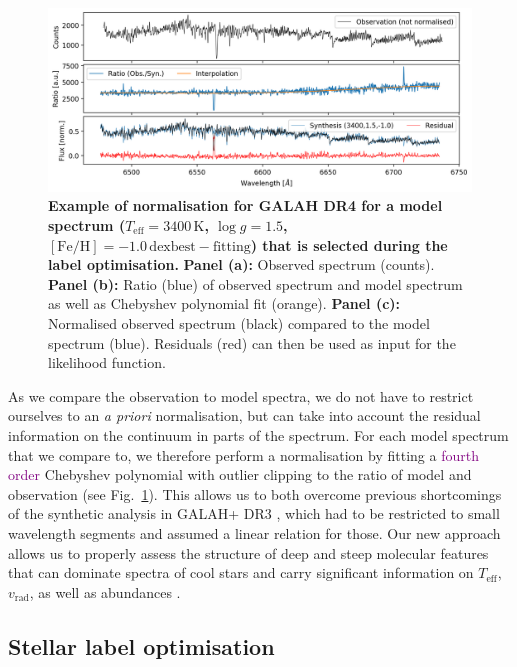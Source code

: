 \documentclass[
  journal=pasa,
  manuscript=research-paper, %
  year=2024,
  volume=37
]{cup-journal}
\newcommand{\adjusted}[1]{{\textcolor{purple}{#1}}}
\newcommand{\Teff}{$T_\mathrm{eff}$\xspace}
\newcommand{\vrad}{$v_\mathrm{rad}$\xspace}
\begin{document}
\begin{figure}[ht]
\centering
\includegraphics[width=\textwidth]{figures/Nuisance_example.png}
\caption{
\textbf{Example of normalisation for GALAH DR4 for a model spectrum ($T_\mathrm{eff} = 3400\,\mathrm{K}$, $\log g = 1.5$, $\mathrm{[Fe/H]} = -1.0\,\mathrm{dexbest-fitting }$) that is selected during the label optimisation.}
\textbf{Panel (a):} Observed spectrum (counts).
\textbf{Panel (b):} Ratio (blue) of observed spectrum and model spectrum as well as Chebyshev polynomial fit (orange).
\textbf{Panel (c):} Normalised observed spectrum (black) compared to the model spectrum (blue). Residuals (red) can then be used as input for the likelihood function.
}
\label{fig:ratio_normalisation}
\end{figure}

As we compare the observation to model spectra, we do not have to restrict ourselves to an \textit{a priori} normalisation, but can take into account the residual information on the continuum in parts of the spectrum. For each model spectrum that we compare to, we therefore perform a normalisation by fitting a \adjusted{fourth order} Chebyshev polynomial with outlier clipping to the ratio of model and observation (see Fig.~\ref{fig:ratio_normalisation}). This allows us to both overcome previous shortcomings of the synthetic analysis in GALAH+ DR3 \citep{Buder2021}, which had to be restricted to small wavelength segments and assumed a linear relation for those. Our new approach allows us to properly assess the structure of deep and steep molecular features that can dominate spectra of cool stars and carry significant information on \Teff, \vrad, as well as abundances \citep{Mann2012}.

\subsection{Stellar label optimisation}
\label{sec:stellar_label_optimisation}
\end{document}
